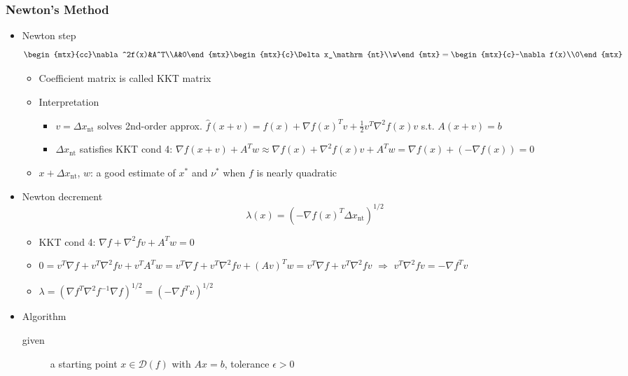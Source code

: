 \subsubsection*{Newton's Method}
\begin{itemize}
    \item Newton step
        $$ \begin{mtx}{cc}\nabla^2f(x)&A^T\\A&0\end{mtx}\begin{mtx}{c}\Delta x_\mathrm{nt}\\w\end{mtx}=\begin{mtx}{c}-\nabla f(x)\\0\end{mtx} $$
    \begin{itemize}
        \item Coefficient matrix is called KKT matrix
        \item Interpretation
        \begin{itemize}
            \item $v=\Delta x_\mathrm{nt}$ solves 2nd-order approx. $\hat{f}(x+v)=f(x)+\nabla f(x)^Tv+\frac{1}{2}v^T\nabla^2 f(x)v$ s.t. $A(x+v)=b$
            \item $\Delta x_\mathrm{nt}$ satisfies KKT cond 4: $\nabla f(x+v)+A^Tw\approx\nabla f(x)+\nabla^2 f(x)v+A^Tw=\nabla f(x)+(-\nabla f(x))=0$
        \end{itemize}
        \item $x+\Delta x_\mathrm{nt}$, $w$: a good estimate of $x^\ast$ and $\nu^\ast$ when $f$ is nearly quadratic
    \end{itemize}
    \item Newton decrement
        $$ \lambda(x)=\left(-\nabla f(x)^T\Delta x_\mathrm{nt}\right)^{1/2} $$
    \begin{itemize}
        \item KKT cond 4: $\nabla f+\nabla^2fv+A^Tw=0$
        \item $0=v^T\nabla f+v^T\nabla^2fv+v^TA^Tw=v^T\nabla f+v^T\nabla^2fv+(Av)^Tw=v^T\nabla f+v^T\nabla^2fv$ $\Rightarrow$ $v^T\nabla^2fv=-\nabla f^Tv$
        \item $\lambda=\left(\nabla f^T\nabla^2f^{-1}\nabla f\right)^{1/2}=\left(-\nabla f^Tv\right)^{1/2}$
    \end{itemize}
    \newpage
    \item Algorithm
    \begin{description}
        \item[given] a starting point $x\in\mathcal{D}(f)$ with $Ax=b$, tolerance $\epsilon>0$

\end{description}
\end{itemize}
